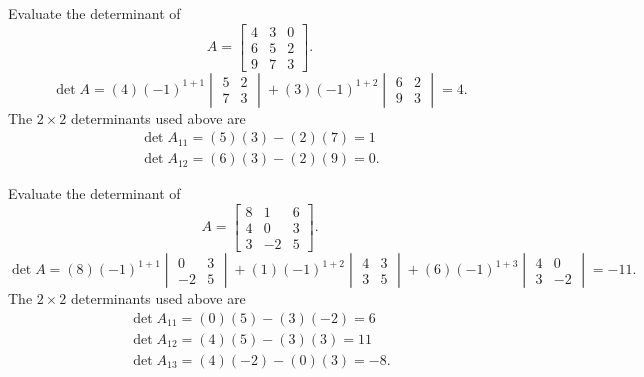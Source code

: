 \goal Evaluate the determinant of
\[A=\begin{bmatrix}4&3&0\\6&5&2\\9&7&3\end{bmatrix}.\]
\[
\det A=(4)(-1)^{1+1}\begin{vmatrix}5&2\\7&3\end{vmatrix} + (3)(-1)^{1+2}\begin{vmatrix}6&2\\9&3\end{vmatrix}=4.
\]
The $2\times2$ determinants used above are
\[
\begin{gathered}\det A_{11}=(5)(3)-(2)(7)=1\\\det A_{12}=(6)(3)-(2)(9)=0.\end{gathered}
\]

\goal Evaluate the determinant of
\[A=\begin{bmatrix}8&1&6\\4&0&3\\3&-2&5\end{bmatrix}.\]
\[
\det A=(8)(-1)^{1+1}\begin{vmatrix}0&3\\-2&5\end{vmatrix} + (1)(-1)^{1+2}\begin{vmatrix}4&3\\3&5\end{vmatrix} + (6)(-1)^{1+3}\begin{vmatrix}4&0\\3&-2\end{vmatrix}=-11.
\]
The $2\times2$ determinants used above are
\[
\begin{gathered}\det A_{11}=(0)(5)-(3)(-2)=6\\\det A_{12}=(4)(5)-(3)(3)=11\\\det A_{13}=(4)(-2)-(0)(3)=-8.\end{gathered}
\]

